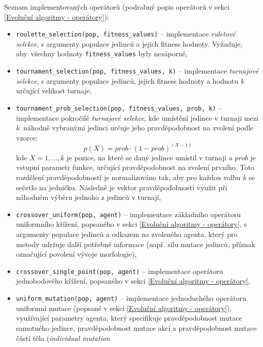 Seznam implementovaných operátorů (podrobný popis operátorů v sekci
\ref{Evoluční algoritmy - operátory}):
\begin{itemize}
    \item \texttt{roulette\_selection(pop, fitness\_values)} -- implementace
        \emph{ruletové selekce}, s argumenty populace jedinců a jejich fitness
        hodnoty. Vyžaduje, aby~všechny hodnoty \texttt{fitness\_values} byly
        nezáporné,
    \item \texttt{tournament\_selection(pop, fitness\_values, k)} --
        implementace \emph{turnajové selekce}, s argumenty populace
        jedinců, jejich fitness hodnoty a hodnotu $k$ určující velikost turnaje,
    \item \texttt{tournament\_prob\_selection(pop, fitness\_values, prob, k)}
        -- implementace pokročilé \emph{turnajové selekce}, kde umístění
        jedince v turnaji mezi $k$~náhodně vybranými jedinci určuje jeho
        pravděpodobnost na zvolení podle vzorce: 
        \begin{equation}
            p(X) = prob\cdot(1-prob)^{(X-1)}
        \end{equation}
        kde $X=1,...,k$ je pozice, na které se daný jedince umístil v turnaji a $prob$
        je vstupní parametr funkce, určující pravděpodobnost na zvolení
        prvního. Toto rozdělení pravděpodobností je normalizováno tak, aby pro
        každou volbu $k$ se sečetlo na jedničku. Následně je vektor
        pravděpodobností využit při náhodném výběru jednoho z jedinců v
        turnaji, 
    \item \texttt{crossover\_uniform(pop, agent)} -- implementace základního
        operátoru uniformního křížení, popsaného v sekci \ref{Evoluční
        algoritmy - operátory}, s argumenty populace jedinců a odkazem na
        zvoleného agenta, který pro metody udržuje další potřebné informace
        (např. sílu mutace jedinců, příznak označující povolení vývoje
        morfologie),
    \item \texttt{crossover\_single\_point(pop, agent)} -- implementace
        operátoru jednobodového křížení, popsaného v sekci \ref{Evoluční
        algoritmy - operátory},
    \item \texttt{uniform\_mutation(pop, agent)} -- implementace jednoduchého
        operátoru uniformní mutace (popsané v sekci \ref{Evoluční algoritmy -
        operátory}), využívající parametry agenta, který specifikuje
        pravděpodobnost mutace samotného jedince, pravděpodobnost mutace akcí a
        pravděpodobnost mutace částí těla (\emph{individual mutation
}
\end{itemize}
